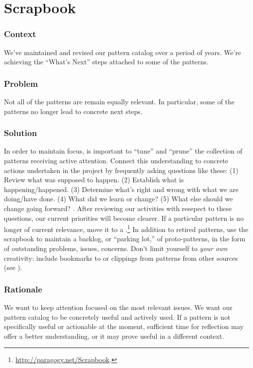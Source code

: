 \section{Scrapbook} \label{sec:Scrapbook}

\subsubsection*{Context} We've maintained and revised our pattern catalog over a period of years.  We're achieving
the ``What's Next'' steps attached to some of the patterns.

\subsubsection*{Problem} Not all of the patterns are remain equally relevant.  In particular, some of the patterns no longer lead to concrete next steps.

\subsubsection*{Solution} In order to maintain focus, is important to ``tune'' and ``prune'' the collection of patterns receiving active attention.  Connect this understanding to concrete actions undertaken in the project by frequently asking questions like these:
(1) Review what was supposed to happen.
(2) Establish what is happening/happened.
(3) Determine what’s right and wrong with what we are doing/have done.
(4) What did we learn or change? 
(5) What else should we change going forward?  \cite[Chapter 28]{peeragogy-handbook}.
%
After reviewing our activities with resepect to these questions, our
current priorities will become clearer.  If a particular pattern is no
longer of current relevance, move it to a
.\footnote{\url{http://paragogy.net/Scrapbook}.}  In addition
to retired patterns, use the scrapbook to maintain a backlog, or
``parking lot,'' of proto-patterns, in the form of outstanding
problems, issues, concerns.  Don't limit yourself to \emph{your own}
creativity: include bookmarks to or clippings from patterns from other
sources (see ).

\subsubsection*{Rationale} We want to keep attention focused on the most relevant issues.
We want our pattern catalog to be concretely useful and actively used.
If a pattern is not specifically useful or actionable at the
moment, sufficient time for reflection may offer a better
understanding, or it may prove useful in a different context.


